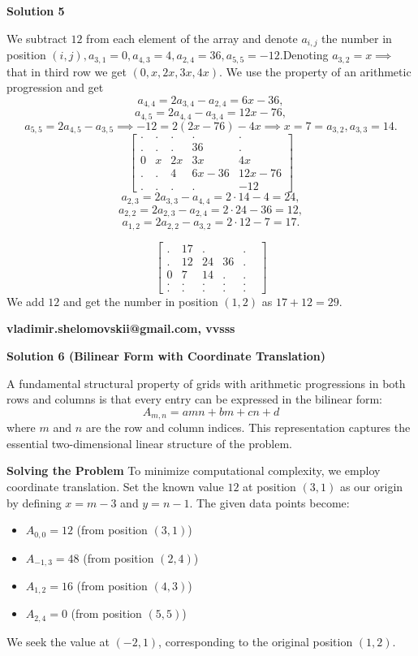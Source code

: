 \begin{enumerate}
\textbf{Solution 5}

We subtract $12$ from each element of the array and denote $a_{i,j}$ the number in position $(i,j), a_{3,1} = 0, a_{4,3} = 4,  a_{2,4} = 36,  a_{5,5} = - 12.$Denoting $a_{3,2} = x \implies$ that in third row we get $(0, x, 2x, 3x, 4x).$ We use the property of an arithmetic progression and get
 \[a_{4,4} = 2a_{3,4} - a_{2,4} = 6x - 36,\] 
 \[a_{4,5} = 2 a_{4,4}- a_{3,4} = 12x - 76,\]
 \[a_{5,5} = 2 a_{4,5}- a_{3,5} \implies  - 12 = 2(2x - 76) - 4x \implies x = 7 = a_{3,2},  a_{3,3}=14.\]
 \[\begin{bmatrix} .&.&.&.&. \\ .&.&.&36&.\\ 0&x&2x&3x&4x\\ .&.&4&6x-36&12x-76\\ .&.&.&.&-12\end{bmatrix}\]
 \[a_{2,3} = 2 a_{3,3}- a_{4,4} = 2 \cdot 14 - 4 = 24,\]
 \[a_{2,2} = 2 a_{2,3}- a_{2,4} = 2 \cdot 24 - 36 = 12,\]
 \[a_{1,2} = 2 a_{2,2}- a_{3,2} = 2 \cdot 12 - 7 = 17.\]

 \[\begin{bmatrix} .&17&.&&.& \\ .&12&24&36&.\\ 0&7&14&.&.\\ .&.&.&.&.\\ .&.&.&.&.\end{bmatrix}\]We add $12$ and get the number in position $(1,2)$ as $17 + 12 = 29.$

 \textbf{vladimir.shelomovskii@gmail.com, vvsss}

 



\textbf{Solution 6 (Bilinear Form with Coordinate Translation)}

A fundamental structural property of grids with arithmetic progressions in both rows and columns is that every entry can be expressed in the bilinear form:
 \[A_{m,n} = amn + bm + cn + d\]where $m$ and $n$ are the row and column indices. This representation captures the essential two-dimensional linear structure of the problem.

 \textbf{Solving the Problem} To minimize computational complexity, we employ coordinate translation. Set the known value $12$ at position $(3,1)$ as our origin by defining $x = m - 3$ and $y = n - 1$. The given data points become:

 
            \begin{itemize}
        \item $A_{0,0} = 12$ (from position $(3,1)$)
        \item $A_{-1,3} = 48$ (from position $(2,4)$)
        \item $A_{1,2} = 16$ (from position $(4,3)$)
        \item $A_{2,4} = 0$ (from position $(5,5)$)
            \end{itemize}
            We seek the value at $(-2, 1)$, corresponding to the original position $(1,2)$.


\end{enumerate}
